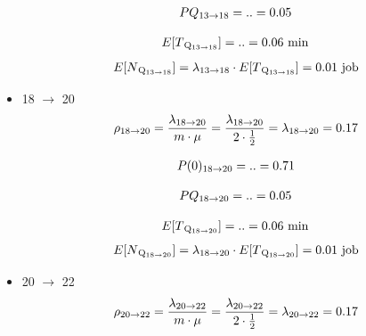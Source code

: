\documentclass[a4paper, 12pt]{article}
\begin{document}
\begin{itemize}
\[
\begin{aligned}
  PQ\textsubscript{13$\rightarrow$18} = .. = 0.05 
\end{aligned}
\]

\[
\begin{aligned}
  E[T\textsubscript{Q\textsubscript{13$\rightarrow$18}}] = .. = 0.06 \text{ min} 
\end{aligned}
\]
\[
\begin{aligned}
  E[N\textsubscript{Q\textsubscript{13$\rightarrow$18}}] = \lambda\textsubscript{13$\rightarrow$18}
\cdot E[T\textsubscript{Q\textsubscript{13$\rightarrow$18}}] = 0.01 \text{ job} 
\end{aligned}
\]


\item 18 $\rightarrow$ 20
\[
\begin{aligned}
  \rho\textsubscript{18$\rightarrow$20} = \frac{\lambda\textsubscript{18$\rightarrow$20}}{m \cdot \mu}
= \frac{\lambda\textsubscript{18$\rightarrow$20}}{2 \cdot \frac{1}{2}} =\lambda\textsubscript{18$\rightarrow$20} = 0.17
\end{aligned}
\]

\[
\begin{aligned}
  P(0)\textsubscript{18$\rightarrow$20} = .. = 0.71 
\end{aligned}
\]

\[
\begin{aligned}
  PQ\textsubscript{18$\rightarrow$20} = .. = 0.05 
\end{aligned}
\]

\[
\begin{aligned}
  E[T\textsubscript{Q\textsubscript{18$\rightarrow$20}}] = .. = 0.06 \text{ min} 
\end{aligned}
\]
\[
\begin{aligned}
  E[N\textsubscript{Q\textsubscript{18$\rightarrow$20}}] = \lambda\textsubscript{18$\rightarrow$20}
\cdot E[T\textsubscript{Q\textsubscript{18$\rightarrow$20}}] = 0.01 \text{ job} 
\end{aligned}
\]


\item 20 $\rightarrow$ 22
\[
\begin{aligned}
  \rho\textsubscript{20$\rightarrow$22} = \frac{\lambda\textsubscript{20$\rightarrow$22}}{m \cdot \mu}
= \frac{\lambda\textsubscript{20$\rightarrow$22}}{2 \cdot \frac{1}{2}} =\lambda\textsubscript{20$\rightarrow$22} = 0.17
\end{aligned}
\]


\end{itemize}
\end{document}
